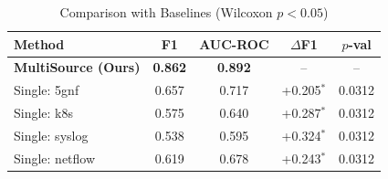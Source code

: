 \begin{table}[t]
\centering
\caption{Comparison with Baselines (Wilcoxon $p<0.05$)}
\label{tab:baselines}
\begin{tabular}{lcccc}
\toprule
Method & F1 & AUC-ROC & $\Delta$F1 & $p$-val \\
\midrule
\textbf{MultiSource (Ours)} & \textbf{0.862} & \textbf{0.892} & -- & -- \\
Single: 5gnf & 0.657 & 0.717 & +0.205$^*$ & 0.0312 \\
Single: k8s & 0.575 & 0.640 & +0.287$^*$ & 0.0312 \\
Single: syslog & 0.538 & 0.595 & +0.324$^*$ & 0.0312 \\
Single: netflow & 0.619 & 0.678 & +0.243$^*$ & 0.0312 \\
\bottomrule
\end{tabular}
\vspace{1pt}{\small $^*$ $p<0.05$, Wilcoxon signed-rank (one-tailed)}
\end{table}